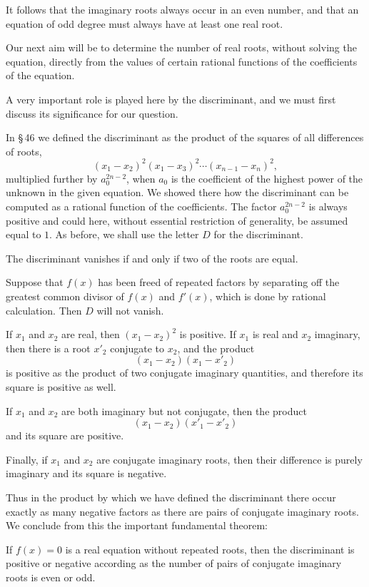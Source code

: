 \documentclass[11pt]{article}
\begin{document}
It follows that the imaginary roots always occur in an even number, and that an equation of odd degree must always have at least one real root.

Our next aim will be to determine the number of real roots, without solving the equation, directly from the values of certain rational functions of the coefficients of the equation.

A very important role is played here by the discriminant, and we must first discuss its significance for our question.

In \S\,46 we defined the discriminant as the product of the squares of all differences of roots,
\[
 (x_1-x_2)^2(x_1-x_3)^2\cdots (x_{n-1}-x_n)^2,
\]
multiplied further by $a_0^{2n-2}$, when $a_0$ is the coefficient of the highest power of the unknown in the given equation. We showed there how the discriminant can be computed as a rational function of the coefficients. The factor $a_0^{2n-2}$ is always positive and could here, without essential restriction of generality, be assumed equal to $1$. As before, we shall use the letter $D$ for the discriminant.

The discriminant vanishes if and only if two of the roots are equal.

Suppose that $f(x)$ has been freed of repeated factors by separating off the greatest common divisor of $f(x)$ and $f'(x)$, which is done by rational calculation. Then $D$ will not vanish.

If $x_1$ and $x_2$ are real, then $(x_1-x_2)^2$ is positive. If $x_1$ is real and $x_2$ imaginary, then there is a root $x'_2$ conjugate to $x_2$, and the product
\[
        (x_1-x_2)(x_1-x'_2)
\]
is positive as the product of two conjugate imaginary quantities, and therefore its square is positive as well.

If $x_1$ and $x_2$ are both imaginary but not conjugate, then the product
\[
        (x_1-x_2)(x'_1-x'_2)
\]
and its square are positive.

Finally, if $x_1$ and $x_2$ are conjugate imaginary roots, then their difference is purely imaginary and its square is negative.

Thus in the product by which we have defined the discriminant there occur exactly as many negative factors as there are pairs of conjugate imaginary roots. We conclude from this the important fundamental theorem:

If $f(x)=0$ is a real equation without repeated roots, then the discriminant is positive or negative according as the number of pairs of conjugate imaginary roots is even or odd.
\end{document}
